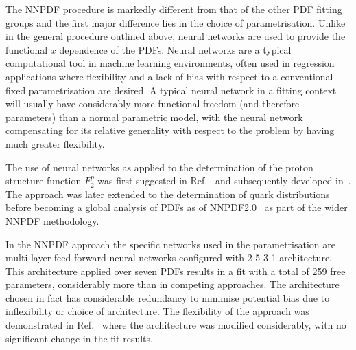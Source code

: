 The NNPDF procedure is markedly different from that of the other PDF fitting groups and the first major difference lies in the choice of parametrisation. Unlike in the general procedure outlined above, neural networks are used to provide the functional $x$ dependence of the PDFs. Neural networks are a typical computational tool in machine learning environments, often used in regression applications where flexibility and a lack of bias with respect to a conventional fixed parametrisation are desired. A typical neural network in a fitting context will usually have considerably more functional freedom (and therefore parameters) than a normal parametric model, with the neural network compensating for its relative generality with respect to the problem by having much greater flexibility. 

The use of neural networks as applied to the determination of the proton structure function $F_2^p$ was first suggested in Ref.~\cite{Forte:2002fg} and subsequently developed in~\cite{DelDebbio:2004qj}. The approach was later extended to the determination of quark distributions~\cite{DelDebbio:2007ee} before becoming a global analysis of PDFs as of NNPDF2.0~\cite{Ball:2010de} as part of the wider NNPDF methodology.

In the NNPDF approach the specific networks used in the parametrisation are multi-layer feed forward neural networks configured with 2-5-3-1 architecture. This architecture applied over seven PDFs results in a fit with a total of 259 free parameters, considerably more than in competing approaches. The architecture chosen in fact has considerable redundancy to minimise potential bias due to inflexibility or choice of architecture. The flexibility of the approach was demonstrated in Ref.~\cite{Ball:2011eq} where the architecture was modified considerably, with no significant change in the fit results.

